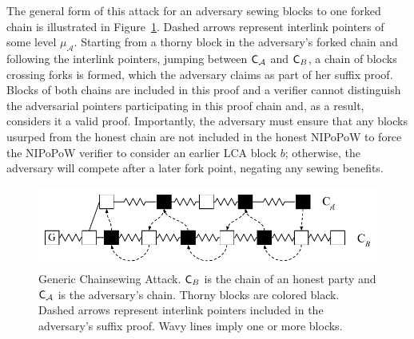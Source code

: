 The general form of this attack for an adversary sewing blocks to one forked chain is illustrated in Figure~\ref{fig:generic_attack}. Dashed arrows represent interlink pointers of some level $\mu_\mathcal{A}$. Starting from a thorny block in the adversary's forked chain and following the interlink pointers, jumping between $\mathsf{C}_\mathcal{A}$ and $\mathsf{C}_B$, a chain of blocks crossing forks is formed, which the adversary claims as part of her suffix proof. Blocks of both chains are included in this proof and a verifier cannot distinguish the adversarial pointers participating in this proof chain and, as a result, considers it a valid proof. Importantly, the adversary must ensure that any blocks usurped from the honest chain are not included in the honest NIPoPoW to force the NIPoPoW verifier to consider an earlier LCA block $b$; otherwise, the adversary will compete after a later fork point, negating any sewing benefits.

\begin{figure}
	\begin{center}
		\includegraphics[width=0.95\columnwidth
		]{figures/generic_chainsewing_attack.pdf}
	\end{center}
	\caption{Generic Chainsewing Attack. $\mathsf{C}_B$ is the chain of an honest party and $\mathsf{C}_\mathcal{A}$ is the adversary's chain. Thorny blocks are colored black. Dashed arrows represent interlink pointers included in the	adversary's suffix proof. Wavy lines imply one or more blocks.}
	\label{fig:generic_attack}
\end{figure}

